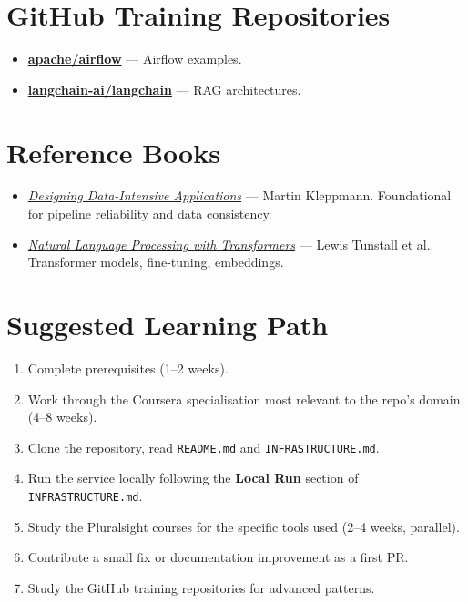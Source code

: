 \documentclass[11pt,a4paper]{article}
\begin{document}
\section{GitHub Training Repositories}
\begin{itemize}[leftmargin=1.5em]
  \item \href{https://github.com/apache/airflow}{\textbf{apache/airflow}} — Airflow examples.
  \item \href{https://github.com/langchain-ai/langchain}{\textbf{langchain-ai/langchain}} — RAG architectures.
\end{itemize}

\section{Reference Books}
\begin{itemize}[leftmargin=1.5em]
  \item \href{https://dataintensive.net/}{\textit{Designing Data-Intensive Applications}} — Martin Kleppmann. Foundational for pipeline reliability and data consistency.
  \item \href{https://www.oreilly.com/library/view/natural-language-processing/9781098136789/}{\textit{Natural Language Processing with Transformers}} — Lewis Tunstall et al.. Transformer models, fine-tuning, embeddings.
\end{itemize}

\section{Suggested Learning Path}
\begin{enumerate}
  \item Complete prerequisites (1--2 weeks).
  \item Work through the Coursera specialisation most relevant to the repo's domain (4--8 weeks).
  \item Clone the repository, read \texttt{README.md} and \texttt{INFRASTRUCTURE.md}.
  \item Run the service locally following the \textbf{Local Run} section of \texttt{INFRASTRUCTURE.md}.
  \item Study the Pluralsight courses for the specific tools used (2--4 weeks, parallel).
  \item Contribute a small fix or documentation improvement as a first PR.
  \item Study the GitHub training repositories for advanced patterns.
\end{enumerate}
\end{document}
